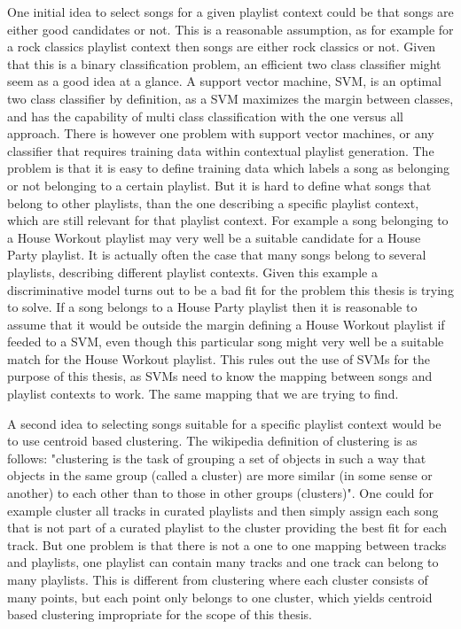 \documentclass[a4paper,11pt]{kth-mag}
\begin{document}
One initial idea to select songs for a given playlist context could be that songs are either good candidates or not. This is a reasonable assumption, as for example for a rock classics playlist context then songs are either rock classics or not. Given that this is a binary classification problem, an efficient two class classifier might seem as a good idea at a glance. A support vector machine, SVM,  is an optimal two class classifier by definition, as a SVM maximizes the margin between classes, and has the capability of multi class classification with the one versus all approach. There is however one problem with support vector machines, or any classifier that requires training data within contextual playlist generation. The problem is that it is easy to define training data which labels a song as belonging or not belonging to a certain playlist. But it is hard to define what songs that belong to other playlists, than the one describing a specific playlist context, which are still relevant for that playlist context. For example a song belonging to a House Workout playlist may very well be a suitable candidate for a House Party playlist. It is actually often the case that many songs belong to several playlists, describing different playlist contexts. Given this example a discriminative model turns out to be a bad fit for the problem this thesis is trying to solve. If a song belongs to a House Party playlist then it is reasonable to assume that it would be outside the margin defining a House Workout playlist if feeded to a SVM, even though this particular song might very well be a suitable match for the House Workout playlist. This rules out the use of SVMs for the purpose of this thesis, as SVMs need to know the mapping between songs and playlist contexts to work. The same mapping that we are trying to find.

A second idea to selecting songs suitable for a specific playlist context would be to use centroid based clustering. The wikipedia definition of clustering is as follows: "clustering is the task of grouping a set of objects in such a way that objects in the same group (called a cluster) are more similar (in some sense or another) to each other than to those in other groups (clusters)". One could for example cluster all tracks in curated playlists and then simply assign each song that is not part of a curated playlist to the cluster providing the best fit for each track. But one problem is that there is not a one to one mapping between tracks and playlists, one playlist can contain many tracks and one track can belong to many playlists. This is different from clustering where each cluster consists of many points, but each point only belongs to one cluster, which yields centroid based clustering impropriate for the scope of this thesis. 
\end{document}
